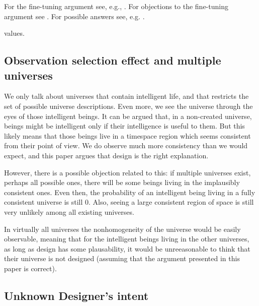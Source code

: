 \documentclass[a4paper
,draft
]{article}
\newcommand{\svn}[2][]{\todo[author=Virgil,color=red!25!white,#1]{#2}}
\newcommand{\paper}[1]{paper}
\newcommand{\ghilimele}[1]{``#1"}
\begin{document}
For the fine-tuning argument see, e.g., \svn{citations}. For objections to the
fine-tuning argument see
\parencites{Manson2003}{Manson2009}{McGrew2001}{Narveson2003}{Sober2009}.
For possible answers see, e.g.
\textcites{Leslie2003}{Swinburne2003}{Monton2006}{Kotzen2012}.

values.


\subsection{Observation selection effect and multiple universes}

We only talk about universes that contain intelligent life, and that restricts
the set of possible universe descriptions.
Even more, we see the universe through the eyes of those intelligent beings.
It can be argued that, in a non-created universe, beings might be intelligent
only if their intelligence is useful to them.
But this likely means that those beings live in a timespace region which seems
consistent from their point of view.
We do observe much more consistency than we would expect, and this \paper{}
argues that design is the right explanation.

However, there is a possible objection related to this: if multiple universes
exist, perhaps all possible ones, there will be some beings living in the
implausibly consistent ones.
Even then, the probability of an intelligent being living in a fully consistent
universe is still $0$.
Also, seeing a large consistent region of space is still very unlikely among
all existing universes.

In virtually all universes the nonhomogeneity of the universe would be
easily observable, meaning that for the intelligent beings living in the
other universes, as long as design has some plausability,
it would be unreeasonable to think that
their universe is not designed (assuming that the argument presented in
this \paper{} is correct).

\subsection{Unknown Designer's intent}
\end{document}
